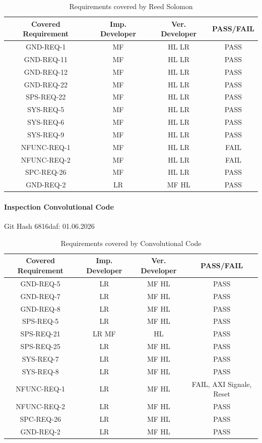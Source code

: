 \begin{table}[H]
	\begin{tabular}{|c|c|c|c|}
		\hline
		\textbf{Covered Requirement} & \textbf{Imp. Developer} & \textbf{Ver. Developer} & \textbf{PASS/FAIL}\\
		\hline
		GND-REQ-1 & MF & HL LR & PASS \\
		\hline
		GND-REQ-11 &MF & HL LR & PASS \\
		\hline
		GND-REQ-12 &MF & HL LR & PASS\\
		\hline
		GND-REQ-22 &MF & HL LR & PASS\\
		\hline
		SPS-REQ-22 &MF & HL LR& PASS \\
		\hline
		SYS-REQ-5 &MF & HL LR& PASS\\
		\hline
		SYS-REQ-6 &MF & HL LR& PASS\\
		\hline
		SYS-REQ-9 &MF & HL LR& PASS\\
		\hline
		NFUNC-REQ-1 &MF & HL LR& FAIL\\
		\hline
		NFUNC-REQ-2 & MF & HL LR& FAIL\\
		\hline
		SPC-REQ-26 & MF & HL LR & PASS\\
		
		\hline
		GND-REQ-2 & LR & MF HL & PASS \\
		\hline
	\end{tabular}
	\caption{Requirements covered by Reed Solomon}
	\label{tab:inspec_R_S}
\end{table}


\paragraph{Inspection Convolutional Code} Git Hash 6816daf: 01.06.2026
\begin{table}[H]
	\begin{tabular}{|c|c|c|c|}
		\hline
		\textbf{Covered Requirement} & \textbf{Imp. Developer} & \textbf{Ver. Developer} & \textbf{PASS/FAIL}\\
		\hline
		GND-REQ-5 & LR & MF HL & PASS \\
		\hline
		GND-REQ-7 & LR & MF HL & PASS \\
		\hline
		GND-REQ-8 & LR & MF HL & PASS \\
		\hline
		SPS-REQ-5 & LR & MF HL & PASS \\
		\hline
		SPS-REQ-21 & LR MF & HL & PASS \\
		\hline
		SPS-REQ-25 & LR & MF HL & PASS \\
		\hline
		SYS-REQ-7 & LR & MF HL & PASS \\
		\hline
		SYS-REQ-8 & LR & MF HL & PASS \\
		\hline
		NFUNC-REQ-1 & LR & MF HL & FAIL, AXI Signale, Reset \\
		\hline
		NFUNC-REQ-2 & LR & MF HL & PASS \\
		\hline
		SPC-REQ-26 & LR & MF HL & PASS \\
		\hline
		GND-REQ-2 & LR & MF HL & PASS \\
		
		\hline
	\end{tabular}
	\caption{Requirements covered by Convolutional Code}
	\label{tab:inspec_C_C}
\end{table}


